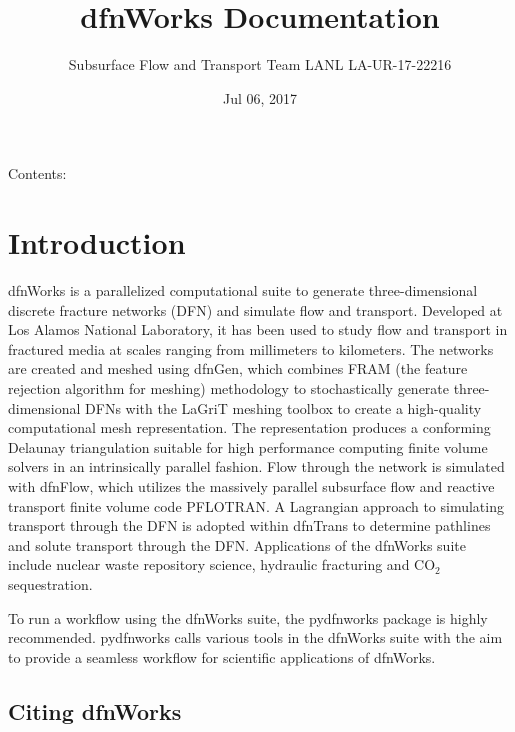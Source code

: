 \documentclass[letterpaper,10pt,english]{sphinxmanual}
\title{dfnWorks Documentation}
\date{Jul 06, 2017}
\author{Subsurface Flow and Transport Team 
 LANL 
 LA-UR-17-22216}
\begin{document}
\maketitle
\sphinxtableofcontents
{}\label{\detokenize{index::doc}}


Contents:


\chapter{Introduction}
\label{\detokenize{intro:introduction}}\label{\detokenize{intro:welcome-to-dfnworks-2-0-documentation}}\label{\detokenize{intro::doc}}
dfnWorks is a parallelized computational suite to generate three-dimensional
discrete fracture networks (DFN) and simulate flow and transport. Developed at
Los Alamos National Laboratory, it has been used to study flow and transport
in fractured media at scales ranging from millimeters to kilometers. The
networks are created and meshed using dfnGen, which combines FRAM (the feature
rejection algorithm for meshing) methodology to stochastically generate
three-dimensional DFNs with the LaGriT meshing toolbox to create a high-quality
computational mesh representation. The representation produces a conforming
Delaunay triangulation suitable for high performance computing finite volume
solvers in an intrinsically parallel fashion. Flow through the network is
simulated with dfnFlow, which utilizes the massively parallel subsurface flow
and reactive transport finite volume code PFLOTRAN. A Lagrangian approach to
simulating transport through the DFN is adopted within dfnTrans to determine
pathlines and solute transport through the DFN. Applications of the dfnWorks
suite include nuclear waste repository science, hydraulic fracturing and
CO$_{\text{2}}$ sequestration.

To run a workflow using the dfnWorks suite, the pydfnworks package is
highly recommended. pydfnworks calls various tools in the dfnWorks suite with
the aim to provide a seamless workflow for scientific applications of dfnWorks.


\section{Citing dfnWorks}
\label{\detokenize{intro:citing-dfnworks}}
\end{document}
